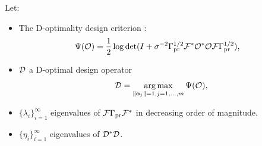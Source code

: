 \begin{theorem}\label{thm:char}
  Let:
  \begin{itemize}
    \item The D-optimality design criterion
    \cite{AlexanderianGloorGhattas14}:
    \begin{align*}
      \begin{split}
        \tar(\obs) %
        &= \frac12 \log \det ( I + \sigma^{-2} \prcov^{1/2} \fwd ^*
        \obs^* \obs \fwd \prcov^{1/2}), 
      \end{split}
    \end{align*}
  \item \(\mathcal{D}\) a D-optimal design operator
    \begin{equation*}
      \opt = \argmax_{\|\meas_j\| = 1, j=1,\dots,m}\tar(\obs),
    \end{equation*}
  \item \(\{\lambda_i\}_{i=1}^\infty\) eigenvalues of
    \(\mathcal{F}\Gamma_{\textup{pr}}\mathcal{F}^*\) in decreasing order of magnitude.
  \item \(\{\eta_i\}_{i=1}^\infty\) eigenvalues of \(\mathcal{D}^*\mathcal{D}\).
 
  \end{itemize}


\end{theorem}
